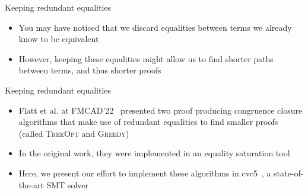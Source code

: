 \documentclass[aspectratio=169]{beamer}
\newcommand\vitem{\vfill\item}
\newcommand\pvitem{\pause\vfill\item}
\begin{document}
\begin{frame}{Keeping redundant equalities}
  \begin{itemize}
    \item You may have noticed that we discard equalities between terms we
    already know to be equivalent
    \vitem However, keeping these equalities might allow us to find shorter
    paths between terms, and thus shorter proofs
  \end{itemize}
\end{frame}

\begin{frame}{Keeping redundant equalities}
  \begin{itemize}
    \item Flatt et al. at FMCAD'22~\cite{flatt2022} presented two proof
    producing congruence closure algorithms that make use of redundant
    equalities to find smaller proofs (called \textsc{TreeOpt} and
    \textsc{Greedy})
    \pvitem In the original work, they were implemented in an equality
    saturation tool
    \pvitem Here, we present our effort to implement these algorithms in
    cvc5~\cite{Barbosa2022-cvc5}, a state-of-the-art SMT solver
  \end{itemize}
\end{frame}
\end{document}
